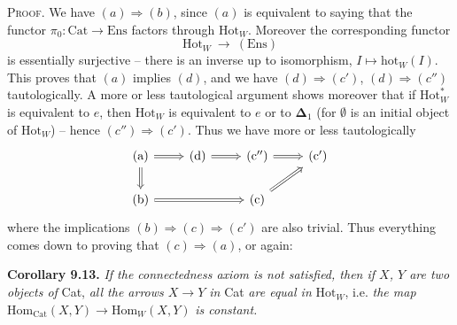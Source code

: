 \documentclass[11pt]{article}
\newcommand{\printedpage}[1]{\marginpar{\footnotesize p.~#1}}
\newcommand{\msp}[1]{\marginpar{\footnotesize [#1]}}
\newcommand{\Hot}{\mathrm{Hot}}
\newcommand{\Hom}{\mathrm{Hom}}
\newcommand{\Cat}{\mathrm{Cat}}
\newcommand{\hot}{\mathrm{hot}}
\begin{document}
\printedpage{72}
\textsc{Proof}. We have $(a)\Longrightarrow(b)$, since $(a)$ is equivalent to saying that the functor $\pi_0:\Cat\longrightarrow\mathrm{Ens}$ factors through $\Hot_W$. Moreover the corresponding functor
\[
\Hot_W\ \longrightarrow\ (\mathrm{Ens})
\]
is essentially surjective -- there is an inverse up to isomorphism, $I\longmapsto\hot_W(I)$. This proves that $(a)$ implies $(d)$, and we have $(d)\Longrightarrow(c')$, $(d)\Longrightarrow(c'')$ tautologically. A more or less tautological argument shows moreover that if $\Hot_W^*$ is equivalent to $e$, then $\Hot_W$ is equivalent to $e$ or to $\boldsymbol{\Delta}_1$ (for $\emptyset$ is an initial object of $\Hot_W$) -- hence $(c'')\Longrightarrow(c')$. Thus we have more or less tautologically
\[
\begin{tikzcd}
(\mathrm{a}) \arrow[r, Rightarrow] \arrow[d, Rightarrow] & (\mathrm{d}) \arrow[r, Rightarrow] & (\mathrm{c}'') \arrow[r, Rightarrow] & (\mathrm{c}') \\
(\mathrm{b}) \arrow[rr, Rightarrow] & & (\mathrm{c}) \arrow[ru, Rightarrow] &
\end{tikzcd}
\]
where the implications $(b)\Longrightarrow(c)\Longrightarrow(c')$ are also trivial. Thus
\msp{page 133 ter}everything comes down to proving that $(c)\Longrightarrow(a)$, or again:

\textbf{Corollary 9.13.} \textit{If the connectedness axiom is not satisfied, then if $X$, $Y$ are two objects of} Cat, \textit{all the arrows $X\longrightarrow Y$ in} Cat \textit{are equal in} $\Hot_W$, i.e. \textit{the map} $\Hom_{\Cat}(X,Y)\longrightarrow\Hom_W(X,Y)$ \textit{is constant.}
\end{document}
